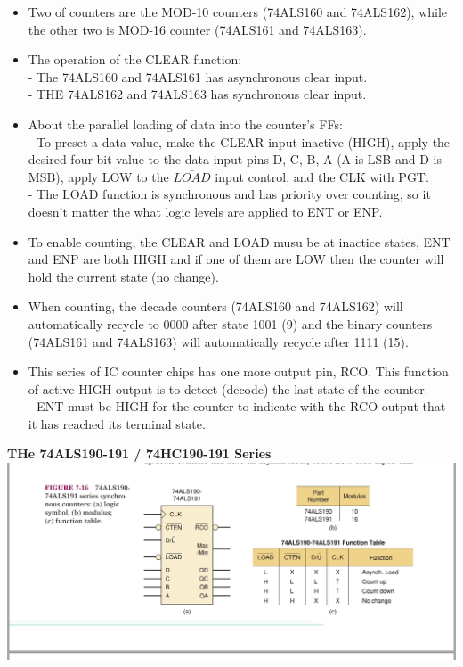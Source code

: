 \documentclass[12pt]{article}
\begin{document}
\begin{itemize}
	\item Two of counters are the MOD-10 counters (74ALS160 and 74ALS162), while the other two is MOD-16 counter (74ALS161 and 74ALS163).
	\item The operation of the CLEAR function: \\
	- The 74ALS160 and 74ALS161 has asynchronous clear input. \\
	- THE 74ALS162 and 74ALS163 has synchronous clear input. \\
	\item About the parallel loading of data into the counter's FFs: \\
	- To preset a data value, make the CLEAR input inactive (HIGH), apply the desired four-bit value to the data input pins D, C, B, A (A is LSB and D is MSB), apply LOW to the $\bar{LOAD}$ input control, and the CLK with PGT. \\
	- The LOAD function is synchronous and has priority over counting, so it doesn't matter the what logic levels are applied to ENT or ENP. \\
	\item To enable counting, the CLEAR and LOAD musu be at inactice states, ENT and ENP are both HIGH and if one of them are LOW then the counter will hold the current state (no change). \\
	\item When counting, the decade counters (74ALS160 and 74ALS162) will automatically recycle to 0000 after state 1001 (9) and the binary counters (74ALS161 and 74ALS163) will automatically recycle after 1111 (15).
	\item This series of IC counter chips has one more output pin, RCO. This function of active-HIGH output is to detect (decode) the last state of the counter. \\
	- ENT must be HIGH for the counter to indicate with the RCO output that it has reached its terminal state.
\end{itemize}
\bigbreak
\textbf{THe 74ALS190-191 / 74HC190-191 Series} \\
\includegraphics[scale = 0.5]{hinh53}
\bigbreak
\end{document}
